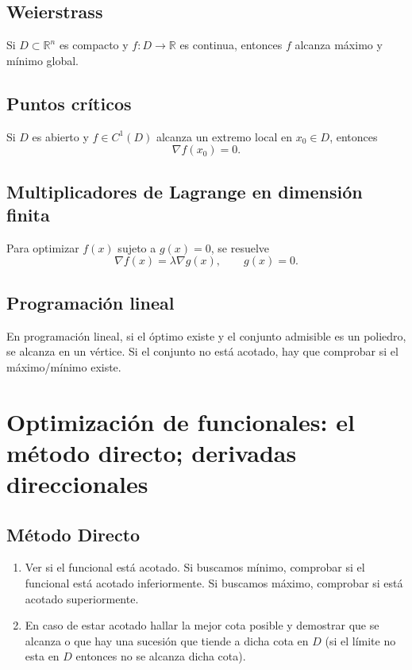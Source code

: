 \documentclass[12pt]{book}
\begin{document}
    \subsection{Weierstrass}
    Si $D\subset\mathbb R^n$ es compacto y $f:D\to\mathbb R$ es continua,
    entonces $f$ alcanza máximo y mínimo global.

    \subsection{Puntos críticos}
    Si $D$ es abierto y $f\in C^1(D)$ alcanza un extremo local en $x_0\in D$,
    entonces
    \[
    \nabla f(x_0)=0.
    \]

    \subsection{Multiplicadores de Lagrange en dimensión finita}
    Para optimizar $f(x)$ sujeto a $g(x)=0$, se resuelve
    \[
    \nabla f(x)=\lambda \nabla g(x),\qquad g(x)=0.
    \]

    \subsection{Programación lineal}
    En programación lineal, si el óptimo existe y el conjunto admisible es un poliedro,
    se alcanza en un vértice. Si el conjunto no está acotado, hay que comprobar si el
    máximo/mínimo existe.

    \section{Optimización de funcionales: el método directo; derivadas direccionales}

    \subsection{Método Directo}
    \begin{enumerate}
        \item Ver si el funcional está acotado. Si buscamos mínimo, comprobar si el funcional está acotado inferiormente. Si buscamos máximo, comprobar si está acotado superiormente.
        \item En caso de estar acotado hallar la mejor cota posible y demostrar que se alcanza o que hay una sucesión que tiende a dicha cota en $D$ (si el límite no esta en $D$ entonces no se alcanza dicha cota).
    \end{enumerate}
\end{document}
